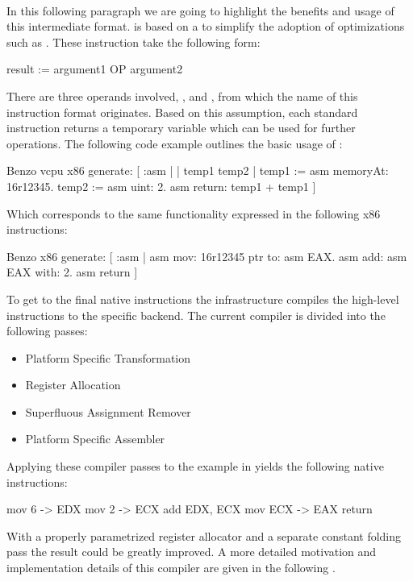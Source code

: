\paragraph{\VCPU}
In this following paragraph we are going to highlight the benefits and usage of this intermediate format.
\VCPU is based on a \TAC to simplify the adoption of optimizations such as \SSA.
These \TAC instruction take the following form:
%
\begin{stcode}{}
result := argument1 OP argument2
\end{stcode}
%
There are three operands involved, ,  and , from which the name of this instruction format originates.
Based on this assumption, each standard \VCPU instruction returns a temporary variable which can be used for further operations.
The following code example outlines the basic usage of \VCPU:
%
\begin{stcode}[
	label={lst:benzo-problem-vcpu}, 
	caption={Basic \VCPU Example}
]{}
Benzo vcpu x86 generate: [ :asm | | temp1 temp2 |
	temp1 := asm memoryAt: 16r12345.
	temp2 := asm uint: 2.
	asm return: temp1 + temp1 ]
\end{stcode}
%
Which corresponds to the same functionality expressed in the following x86 instructions:
%
\begin{stcode}{}
Benzo x86 generate: [ :asm |
	asm mov: 16r12345 ptr to: asm EAX.
	asm add: asm EAX with: 2.
	asm return ]
\end{stcode}
%
To get to the final native instructions the \VCPU infrastructure compiles the high-level instructions to the specific backend.
The current compiler is divided into the following passes:
%
\begin{itemize}[noitemsep]
\item Platform Specific Transformation
\item Register Allocation
\item Superfluous Assignment Remover
\item Platform Specific Assembler
\end{itemize}
%
Applying these compiler passes to the example in  yields the following native instructions:
%
\begin{stcode}{}
mov   6 -> EDX
mov   2 -> ECX
add EDX,   ECX
mov ECX -> EAX
return 
\end{stcode}


\noindent With a properly parametrized register allocator and a separate constant folding pass the result could be greatly improved.
A more detailed motivation and implementation details of this compiler are given in the following .

